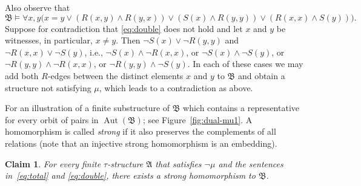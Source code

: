 \documentclass[nonacm]{acmart}
\newcommand{\bA}{{\mathfrak A}}
\newcommand{\bB}{{\mathfrak B}}
\DeclareMathOperator{\Aut}{Aut}
\newtheorem{claim}[theorem]{Claim}
\begin{document}
Also observe that 
\begin{equation} \bB \models \forall x,y  \big(x= y \vee (R(x,y) \wedge R(y,x)) \vee  (S(x) \wedge R(y,y)) \vee (R(x,x) \wedge S(y)) \big ). \label{eq:double}
\end{equation}
Suppose for contradiction that \eqref{eq:double} does not hold and let $x$ and $y$ be witnesses, in particular, $x \neq y$.
Then $\neg S(x) \vee \neg R(y,y)$ 
and $\neg R(x,x) \vee \neg S(y)$, i.e.,
$\neg S(x) \wedge \neg R(x,x)$, 
or $\neg S(x) \wedge \neg S(y)$, 
or $\neg R(y,y) \wedge \neg R(x,x)$, 
or $\neg R(y,y) \wedge \neg S(y)$.
In each of these cases 
we may add both $R$-edges between the distinct elements $x$ and $y$ to $\bB$ and obtain a structure not satisfying $\mu$, which leads to a contradiction as above.

For an illustration of a finite substructure of $\bB$ which contains a representative for every orbit of pairs in $\Aut(\bB)$; see Figure~\ref{fig:dual-mu1}.
A homomorphism is called \emph{strong} 
if it also preserves the complements of all relations (note that an injective strong homomorphism is an embedding).

\begin{claim}\label{cl:1}
For every finite $\tau$-structure $\bA$ that satisfies $\neg \mu$ and the sentences in~\eqref{eq:total} and \eqref{eq:double}, there exists a strong homomorphism to $\bB$. 
\end{claim}
\end{document}
